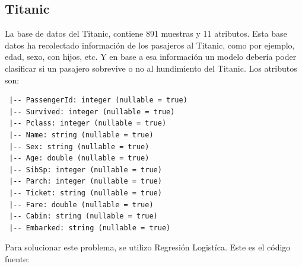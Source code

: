 \documentclass{article}
\begin{document}
\subsection{Titanic}

La base de datos del Titanic, \cite{datapicker} contiene 891 muestras y 11 atributos. Esta base datos ha recolectado información de los pasajeros al Titanic, como por ejemplo, edad, sexo, con hijos, etc. Y en base a esa información un modelo debería poder clasificar si un pasajero sobrevive o no al hundimiento del Titanic. Los atributos son:

\begin{lstlisting}
 |-- PassengerId: integer (nullable = true)
 |-- Survived: integer (nullable = true)
 |-- Pclass: integer (nullable = true)
 |-- Name: string (nullable = true)
 |-- Sex: string (nullable = true)
 |-- Age: double (nullable = true)
 |-- SibSp: integer (nullable = true)
 |-- Parch: integer (nullable = true)
 |-- Ticket: string (nullable = true)
 |-- Fare: double (nullable = true)
 |-- Cabin: string (nullable = true)
 |-- Embarked: string (nullable = true)
\end{lstlisting}

Para solucionar este problema, se utilizo Regresión Logistíca. Este es el código fuente:
\end{document}

